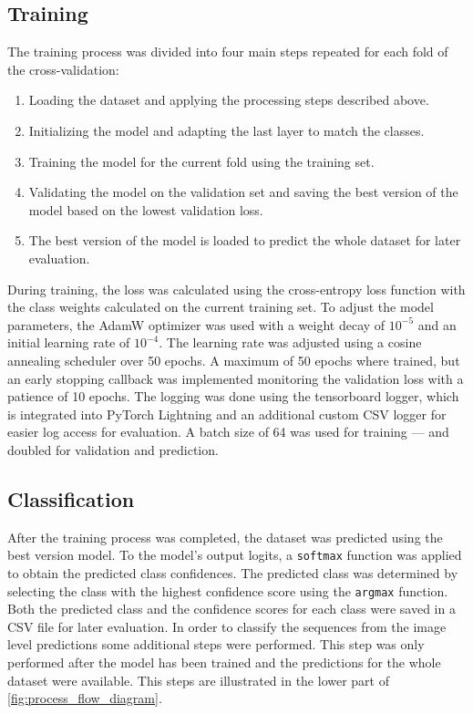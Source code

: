     \subsection{Training}
    The training process was divided into four main steps repeated for each fold of the cross-validation:
    \begin{enumerate}
        \item Loading the dataset and applying the processing steps described above.
        \item Initializing the model and adapting the last layer to match the classes.
        \item Training the model for the current fold using the training set.
        \item Validating the model on the validation set and saving the best version of the model based on the lowest validation loss.
        \item The best version of the model is loaded to predict the whole dataset for later evaluation.
    \end{enumerate}

    During training, the loss was calculated using the cross-entropy loss function with the class weights calculated on the current training set.
    To adjust the model parameters, the AdamW optimizer \autocite{loshchilovDecoupledWeightDecay2019} was used with a weight decay of \(10^{-5}\) and an initial learning rate of \(10^{-4}\).
    The learning rate was adjusted using a cosine annealing scheduler \autocite{loshchilovSGDRStochasticGradient2017} over 50 epochs.
    A maximum of 50 epochs where trained, but an early stopping callback was implemented monitoring the validation loss with a patience of 10 epochs.
    The logging was done using the tensorboard logger, which is integrated into PyTorch Lightning and an additional custom \ac{CSV} logger for easier log access for evaluation.
    A batch size of 64 was used for training --- and doubled for validation and prediction.

    \subsection{Classification}
    After the training process was completed, the dataset was predicted using the best version model.
    To the model's output logits, a \texttt{softmax} function was applied to obtain the predicted class confidences.
    The predicted class was determined by selecting the class with the highest confidence score using the \texttt{argmax} function.
    Both the predicted class and the confidence scores for each class were saved in a \ac{CSV} file for later evaluation.
    In order to classify the sequences from the image level predictions some additional steps were performed.
    This step was only performed after the model has been trained and the predictions for the whole dataset were available.
    This steps are illustrated in the lower part of \autoref{fig:process_flow_diagram}.

